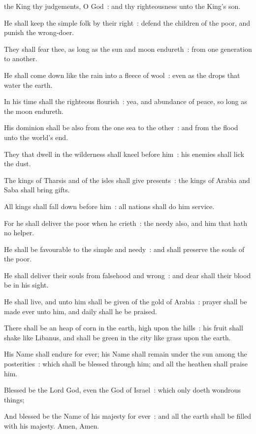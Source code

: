  the King thy judgements, O God~: and thy righteousness unto the King's son.\par
{}
He shall keep the simple folk by their right~: defend the children of the poor, and punish the wrong-doer.\par
{}They shall fear thee, as long as the sun and moon endureth~: from one generation to another.\par
{}He shall come down like the rain into a fleece of wool~: even as the drops that water the earth.\par
{}In his time shall the righteous flourish~: yea, and abundance of peace, so long as the moon endureth.\par
{}His dominion shall be also from the one sea to the other~: and from the flood unto the world's end.\par
{}They that dwell in the wilderness shall kneel before him~: his enemies shall lick the dust.\par
{}The kings of Tharsis and of the isles shall give presents~: the kings of Arabia and Saba shall bring gifts.\par
{}All kings shall fall down before him~: all nations shall do him service.\par
{}For he shall deliver the poor when he crieth~: the needy also, and him that hath no helper.\par
{}He shall be favourable to the simple and needy~: and shall preserve the souls of the poor.\par
{}He shall deliver their souls from falsehood and wrong~: and dear shall their blood be in his sight.\par
{}He shall live, and unto him shall be given of the gold of Arabia~: prayer shall be made ever unto him, and daily shall he be praised.\par
{}There shall be an heap of corn in the earth, high upon the hills~: his fruit shall shake like Libanus, and shall be green in the city like grass upon the earth.\par
{}His Name shall endure for ever; his Name shall remain under the sun among the posterities~: which shall be blessed through him; and all the heathen shall praise him.\par
{}Blessed be the Lord God, even the God of Israel~: which only doeth wondrous things;\par
{}And blessed be the Name of his majesty for ever~: and all the earth shall be filled with his majesty. Amen, Amen.\par

